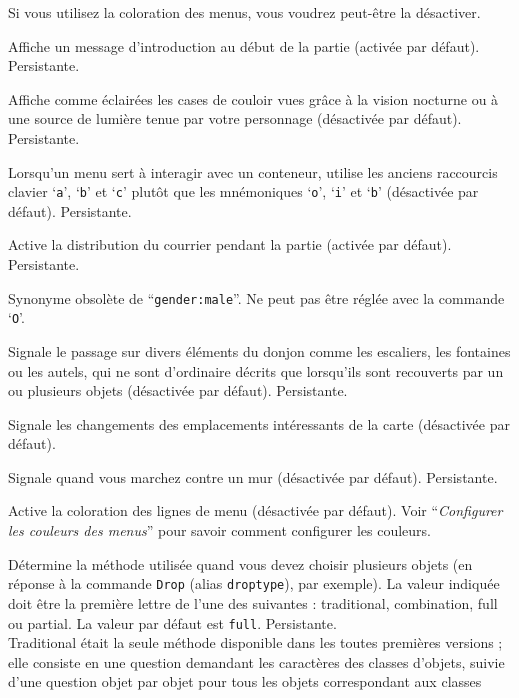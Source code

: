 \documentclass[titlepage]{article}
\begin{document}
\begin{description}[font=\mdseries\itshape]
Si vous utilisez la coloration des menus, vous voudrez peut-être la désactiver.
\item[legacy]
Affiche un message d'introduction au début de la partie (activée par défaut).
Persistante.
\item[lit\textunderscore corridor]
Affiche comme éclairées les cases de couloir vues grâce à la vision nocturne ou à une source
de lumière tenue par votre personnage (désactivée par défaut). Persistante.
\item[lootabc]
Lorsqu'un menu sert à interagir avec un conteneur,
utilise les anciens raccourcis clavier `\texttt{a}', `\texttt{b}' et `\texttt{c}'
plutôt que les mnémoniques `\texttt{o}', `\texttt{i}' et `\texttt{b}' (désactivée par défaut).
Persistante.
\item[mail]
Active la distribution du courrier pendant la partie (activée par défaut). Persistante.
\item[male]
Synonyme obsolète de ``\texttt{gender:male}''. Ne peut pas être réglée avec la
commande `\texttt{O}'.
\item[mention\textunderscore decor]
Signale le passage sur divers éléments du donjon comme les escaliers,
les fontaines ou les autels, qui ne sont d'ordinaire décrits que lorsqu'ils sont recouverts
par un ou plusieurs objets (désactivée par défaut). Persistante.
\item[mention\textunderscore map]
Signale les changements des emplacements intéressants de la carte (désactivée par défaut).
\item[mention\textunderscore walls]
Signale quand vous marchez contre un mur (désactivée par défaut). Persistante.
\item[menucolors]
Active la coloration des lignes de menu (désactivée par défaut).
Voir ``\textit{Configurer les couleurs des menus}'' pour savoir comment configurer les couleurs.
\item[menustyle]
Détermine la méthode utilisée quand vous devez choisir plusieurs objets (en
réponse à la commande \texttt{Drop} (alias \texttt{droptype}), par exemple).
La valeur indiquée doit être la première lettre de l'une des suivantes :
traditional, combination, full ou partial.
La valeur par défaut est \texttt{full}.
Persistante.
\\
Traditional était la seule méthode disponible dans les toutes
premières versions ; elle consiste en une question demandant les caractères des classes d'objets,
suivie d'une question objet par objet pour tous les objets correspondant aux classes

\end{description}
\end{document}
